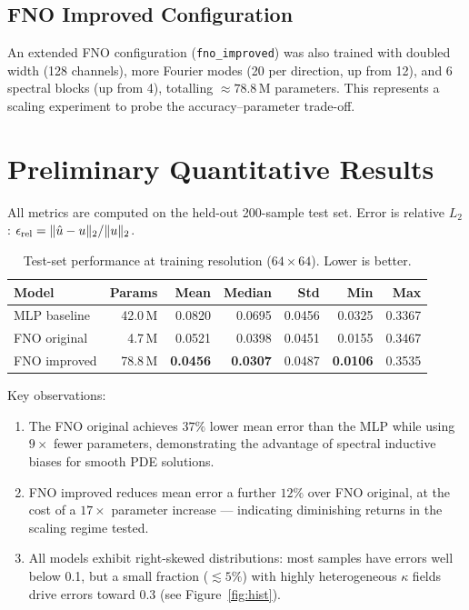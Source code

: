 \documentclass[11pt,a4paper]{article}
\begin{document}
\subsection{FNO Improved Configuration}
An extended FNO configuration (\texttt{fno\_improved}) was also trained with doubled width (128 channels), more Fourier modes (20 per direction, up from 12), and 6 spectral blocks (up from 4), totalling $\approx78.8$\,M parameters. This represents a scaling experiment to probe the accuracy--parameter trade-off.

\section{Preliminary Quantitative Results}

All metrics are computed on the held-out 200-sample test set. Error is relative $L_2$: $\epsilon_{\rm rel} = \|{\hat{u} - u}\|_2 / \|{u}\|_2$.

\begin{table}[H]
\centering
\caption{Test-set performance at training resolution ($64\times64$). Lower is better.}
\label{tab:results}
\begin{tabular}{lrrrrrr}
\toprule
Model & Params & Mean & Median & Std & Min & Max \\
\midrule
MLP baseline   & 42.0\,M & 0.0820 & 0.0695 & 0.0456 & 0.0325 & 0.3367 \\
FNO original   &  4.7\,M & 0.0521 & 0.0398 & 0.0451 & 0.0155 & 0.3467 \\
FNO improved   & 78.8\,M & \textbf{0.0456} & \textbf{0.0307} & 0.0487 & \textbf{0.0106} & 0.3535 \\
\bottomrule
\end{tabular}
\end{table}

Key observations:
\begin{enumerate}[nosep]
  \item The FNO original achieves $37\%$ lower mean error than the MLP while using $9\times$ fewer parameters, demonstrating the advantage of spectral inductive biases for smooth PDE solutions.
  \item FNO improved reduces mean error a further $12\%$ over FNO original, at the cost of a $17\times$ parameter increase --- indicating diminishing returns in the scaling regime tested.
  \item All models exhibit right-skewed distributions: most samples have errors well below 0.1, but a small fraction ($\lesssim5\%$) with highly heterogeneous $\kappa$ fields drive errors toward 0.3 (see Figure~\ref{fig:hist}).
\end{enumerate}
\end{document}
